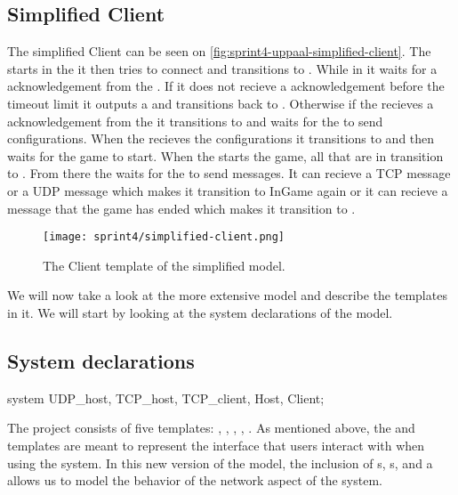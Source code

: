 \subsection*{Simplified Client}
The simplified Client can be seen on  \autoref{fig:sprint4-uppaal-simplified-client}.
The  starts in the  it then tries to connect and transitions to .
While in  it waits for a acknowledgement from the .
If it does not recieve a acknowledgement before the timeout limit it outputs a  and transitions back to .
Otherwise if the  recieves a acknowledgement from the  it transitions to  and waits for the  to send configurations.
When the  recieves the configurations it transitions to  and then waits for the game to start.
When the  starts the game, all  that are in  transition to .
From there the  waits for the  to send messages.
It can recieve a TCP message or a UDP message which makes it transition to InGame again or it can recieve a message that the game has ended which makes it transition to .
\begin{figure}[h]
    \centering
    \texttt{[image: sprint4/simplified-client.png]}
    \caption{The Client template of the simplified \uppaal model.}
    \label{fig:sprint4-uppaal-simplified-client}
\end{figure}

\noindent
We will now take a look at the more extensive \uppaal model and describe the templates in it.
We will start by looking at the system declarations of the model.

\subsection{System declarations}
\begin{uppaalcode}[caption={System declarations}, label={lst:uppaal4:systemdecl},captionpos=b]
    system UDP_host, TCP_host, TCP_client, Host, Client;
\end{uppaalcode}
The project consists of five templates: , , , , .
As mentioned above, the  and  templates are meant to represent the interface that users interact with when using the system.
In this new version of the model, the inclusion of s, s, and a  allows us to model the behavior of the network aspect of the system.

